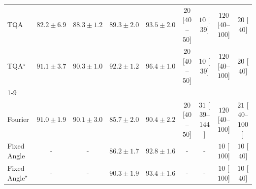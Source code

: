 \begin{tabular}{l|cccc|cccc|}
TQA & {\cellcolor[HTML]{FEE390}} \color[HTML]{000000} $82.2\pm 6.9$ & {\cellcolor[HTML]{F98E23}} \color[HTML]{F1F1F1} $88.3\pm 1.2$ & {\cellcolor[HTML]{F27F1B}} \color[HTML]{F1F1F1} $89.3\pm 2.0$ & {\cellcolor[HTML]{C34802}} \color[HTML]{F1F1F1} $93.5\pm 2.0$ & {\cellcolor[HTML]{FFF5F1}} \color[HTML]{000000} $20$ [$40$--$50$] & {\cellcolor[HTML]{FFF7F3}} \color[HTML]{000000} $10$ [$39$] & {\cellcolor[HTML]{FDD8D5}} \color[HTML]{000000} $120$ [$40$--$100$] & {\cellcolor[HTML]{FFF5F1}} \color[HTML]{000000} $20$ [$40$] \\
TQA$^\star$ & {\cellcolor[HTML]{E2650F}} \color[HTML]{F1F1F1} $91.1\pm 3.7$ & {\cellcolor[HTML]{EC7014}} \color[HTML]{F1F1F1} $90.3\pm 1.0$ & {\cellcolor[HTML]{D55607}} \color[HTML]{F1F1F1} $92.2\pm 1.2$ & {\cellcolor[HTML]{8B3005}} \color[HTML]{F1F1F1} $96.4\pm 1.0$ & {\cellcolor[HTML]{FFF5F1}} \color[HTML]{000000} $20$ [$40$--$50$] & {\cellcolor[HTML]{FFF7F3}} \color[HTML]{000000} $10$ [$39$] & {\cellcolor[HTML]{FDD8D5}} \color[HTML]{000000} $120$ [$40$--$100$] & {\cellcolor[HTML]{FFF5F1}} \color[HTML]{000000} $20$ [$40$] \\
\cline{1-9}
\multicolumn{9}{c}{\rule{0pt}{8pt}PP} \\
\midrule
Fourier & {\cellcolor[HTML]{39A056}} \color[HTML]{F1F1F1} $91.0\pm 1.9$ & {\cellcolor[HTML]{45AD5F}} \color[HTML]{F1F1F1} $90.1\pm 3.0$ & {\cellcolor[HTML]{9DD688}} \color[HTML]{000000} $85.7\pm 2.0$ & {\cellcolor[HTML]{3FA95C}} \color[HTML]{F1F1F1} $90.4\pm 2.2$ & {\cellcolor[HTML]{FFF5F1}} \color[HTML]{000000} $20$ [$40$--$50$] & {\cellcolor[HTML]{FEF1ED}} \color[HTML]{000000} $31$ [$39$--$144$] & {\cellcolor[HTML]{FDD8D5}} \color[HTML]{000000} $120$ [$40$--$100$] & {\cellcolor[HTML]{FFF4F0}} \color[HTML]{000000} $21$ [$40$--$100$] \\
Fixed Angle & {\cellcolor[HTML]{000000}} \color[HTML]{F1F1F1} {\cellcolor{white}} \color{black} - & {\cellcolor[HTML]{000000}} \color[HTML]{F1F1F1} {\cellcolor{white}} \color{black} - & {\cellcolor[HTML]{93D284}} \color[HTML]{000000} $86.2\pm 1.7$ & {\cellcolor[HTML]{258745}} \color[HTML]{F1F1F1} $92.8\pm 1.6$ & {\cellcolor[HTML]{000000}} \color[HTML]{F1F1F1} {\cellcolor{white}} \color{black} - & {\cellcolor[HTML]{000000}} \color[HTML]{F1F1F1} {\cellcolor{white}} \color{black} - & {\cellcolor[HTML]{FFF7F3}} \color[HTML]{000000} $10$ [$100$] & {\cellcolor[HTML]{FFF7F3}} \color[HTML]{000000} $10$ [$40$] \\
Fixed Angle$^\star$ & {\cellcolor[HTML]{000000}} \color[HTML]{F1F1F1} {\cellcolor{white}} \color{black} - & {\cellcolor[HTML]{000000}} \color[HTML]{F1F1F1} {\cellcolor{white}} \color{black} - & {\cellcolor[HTML]{42AB5D}} \color[HTML]{F1F1F1} $90.3\pm 1.9$ & {\cellcolor[HTML]{1E8041}} \color[HTML]{F1F1F1} $93.4\pm 1.6$ & {\cellcolor[HTML]{000000}} \color[HTML]{F1F1F1} {\cellcolor{white}} \color{black} - & {\cellcolor[HTML]{000000}} \color[HTML]{F1F1F1} {\cellcolor{white}} \color{black} - & {\cellcolor[HTML]{FFF7F3}} \color[HTML]{000000} $10$ [$100$] & {\cellcolor[HTML]{FFF7F3}} \color[HTML]{000000} $10$ [$40$] \\

\end{tabular}
